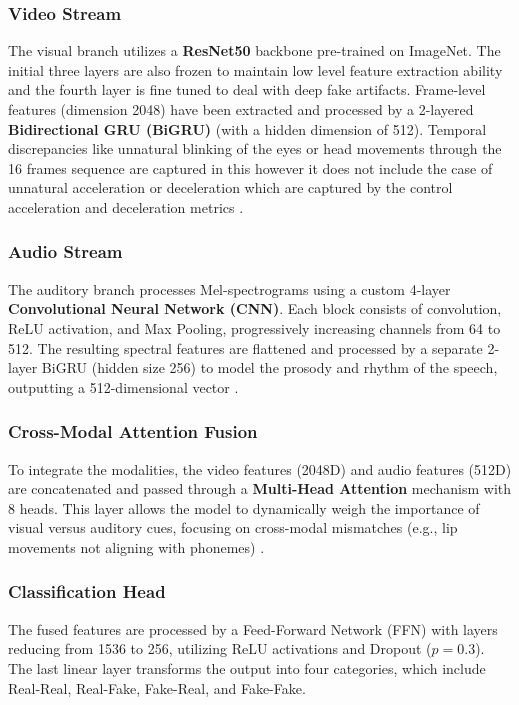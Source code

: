 \documentclass[conference]{IEEEtran}
\begin{document}
\subsubsection{Video Stream}
The visual branch utilizes a \textbf{ResNet50} backbone pre-trained on ImageNet. The initial three layers are also frozen to maintain low level feature extraction ability and the fourth layer is fine tuned to deal with deep fake artifacts. Frame-level features (dimension 2048) have been extracted and processed by a 2-layered \textbf{Bidirectional GRU (BiGRU)} (with a hidden dimension of 512). Temporal discrepancies like unnatural blinking of the eyes or head movements through the 16 frames sequence are captured in this however it does not include the case of unnatural acceleration or deceleration which are captured by the control acceleration and deceleration metrics \cite{Sabir2022,Jung2023Temporal}.

\subsubsection{Audio Stream}
The auditory branch processes Mel-spectrograms using a custom 4-layer \textbf{Convolutional Neural Network (CNN)}. Each block consists of convolution, ReLU activation, and Max Pooling, progressively increasing channels from 64 to 512. The resulting spectral features are flattened and processed by a separate 2-layer BiGRU (hidden size 256) to model the prosody and rhythm of the speech, outputting a 512-dimensional vector \cite{Tak2023Audio}.

\subsubsection{Cross-Modal Attention Fusion}
To integrate the modalities, the video features (2048D) and audio features (512D) are concatenated and passed through a \textbf{Multi-Head Attention} mechanism with 8 heads. This layer allows the model to dynamically weigh the importance of visual versus auditory cues, focusing on cross-modal mismatches (e.g., lip movements not aligning with phonemes) \cite{Li2022Attention,Katamneni2024,Wang2024Sync}
.

\subsubsection{Classification Head}
The fused features are processed by a Feed-Forward Network (FFN) with layers reducing from 1536 to 256, utilizing ReLU activations and Dropout ($p=0.3$). The last linear layer transforms the output into four categories, which include Real-Real, Real-Fake, Fake-Real, and Fake-Fake.
\end{document}
